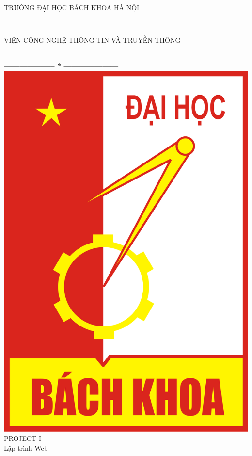 \documentclass[12pt,a4paper]{article}
\begin{document}
\thispagestyle{empty}
\thisfancypage{
\setlength{\fboxsep}{0pt}
\fbox}{}
\begin{center}
\begin{large}
TRƯỜNG ĐẠI HỌC BÁCH KHOA HÀ NỘI
\end{large} \\
\begin{large}
VIỆN CÔNG NGHỆ THÔNG TIN VÀ TRUYỀN THÔNG
\end{large} \\

\textbf{--------------------  *  ---------------------}\\[1.5cm]
\includegraphics[scale=0.35]{12}
\\
\vspace{2cm}
{\fontsize{25pt}{1}\selectfont PROJECT I}\\[1cm]
{\fontsize{15pt}{1}\selectfont Lập trình Web}\\[1cm]
\end{center}
\end{document}
